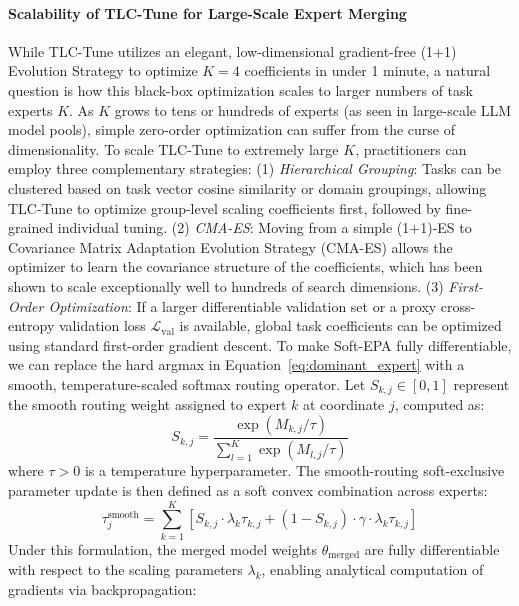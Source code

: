 \paragraph{Scalability of TLC-Tune for Large-Scale Expert Merging}
While TLC-Tune utilizes an elegant, low-dimensional gradient-free (1+1) Evolution Strategy to optimize $K=4$ coefficients in under 1 minute, a natural question is how this black-box optimization scales to larger numbers of task experts $K$. As $K$ grows to tens or hundreds of experts (as seen in large-scale LLM model pools), simple zero-order optimization can suffer from the curse of dimensionality. To scale TLC-Tune to extremely large $K$, practitioners can employ three complementary strategies: (1) \emph{Hierarchical Grouping}: Tasks can be clustered based on task vector cosine similarity or domain groupings, allowing TLC-Tune to optimize group-level scaling coefficients first, followed by fine-grained individual tuning. (2) \emph{CMA-ES}: Moving from a simple (1+1)-ES to Covariance Matrix Adaptation Evolution Strategy (CMA-ES) allows the optimizer to learn the covariance structure of the coefficients, which has been shown to scale exceptionally well to hundreds of search dimensions. (3) \emph{First-Order Optimization}: If a larger differentiable validation set or a proxy cross-entropy validation loss $\mathcal{L}_{\text{val}}$ is available, global task coefficients can be optimized using standard first-order gradient descent. To make Soft-EPA fully differentiable, we can replace the hard argmax in Equation~\ref{eq:dominant_expert} with a smooth, temperature-scaled softmax routing operator. Let $S_{k, j} \in [0, 1]$ represent the smooth routing weight assigned to expert $k$ at coordinate $j$, computed as:
\begin{equation}
\label{eq:smooth_routing}
S_{k, j} = \frac{\exp(M_{k, j} / \tau)}{\sum_{l=1}^K \exp(M_{l, j} / \tau)}
\end{equation}
where $\tau > 0$ is a temperature hyperparameter. The smooth-routing soft-exclusive parameter update is then defined as a soft convex combination across experts:
\begin{equation}
\label{eq:smooth_exclusive_update}
\tau^{\text{smooth}}_j = \sum_{k=1}^K \left[ S_{k, j} \cdot \lambda_k \tau_{k, j} + (1 - S_{k, j}) \cdot \gamma \cdot \lambda_k \tau_{k, j} \right]
\end{equation}
Under this formulation, the merged model weights $\theta_{\text{merged}}$ are fully differentiable with respect to the scaling parameters $\lambda_k$, enabling analytical computation of gradients via backpropagation:
